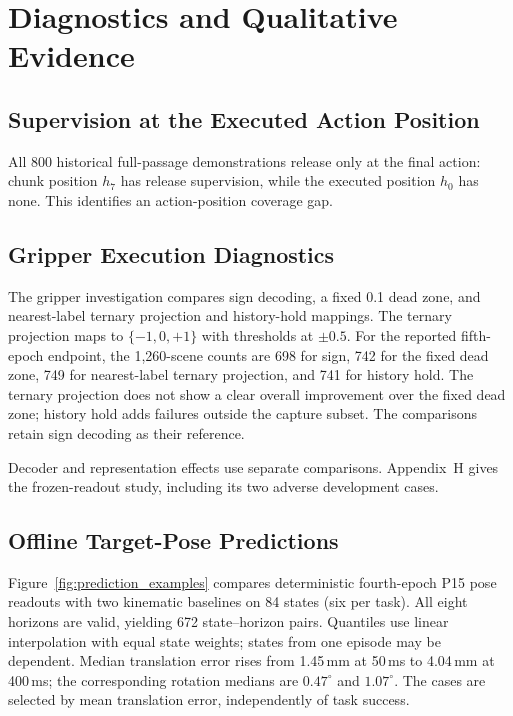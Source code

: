 \section{Diagnostics and Qualitative Evidence}
\label{app:qualitative}

\subsection{Supervision at the Executed Action Position}
All 800 historical full-passage demonstrations release only at the final
action: chunk position $h_7$ has release supervision, while the executed
position $h_0$ has none. This identifies an action-position coverage gap.

\subsection{Gripper Execution Diagnostics}
The gripper investigation compares sign decoding, a fixed 0.1 dead zone,
and nearest-label ternary projection and history-hold mappings. The ternary
projection maps to $\{-1,0,+1\}$ with thresholds at $\pm0.5$.
For the reported fifth-epoch endpoint, the 1,260-scene counts are 698
for sign, 742 for the fixed dead zone, 749 for nearest-label ternary
projection, and 741 for history hold. The ternary projection does not show a
clear overall improvement over the fixed dead zone; history hold adds
failures outside the capture subset. The comparisons retain sign decoding as their reference.

Decoder and representation effects use separate comparisons.
Appendix~H gives the frozen-readout study, including its two adverse
development cases.

\subsection{Offline Target-Pose Predictions}
Figure~\ref{fig:prediction_examples} compares deterministic fourth-epoch P15
pose readouts with two kinematic baselines on 84 states (six per task).
All eight horizons are valid, yielding 672 state--horizon pairs.
Quantiles use linear interpolation with equal state weights; states from
one episode may be dependent. Median translation error rises from
1.45\,mm at 50\,ms to 4.04\,mm at 400\,ms; the corresponding rotation
medians are $0.47^\circ$ and $1.07^\circ$.
The cases are selected by mean translation error, independently of task success.

